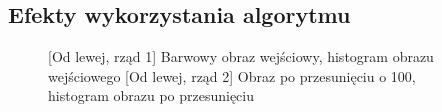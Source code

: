 \documentclass[a4paper,12pt, titlepage]{report}
\begin{document}
\subsection*{Efekty wykorzystania algorytmu}
\begin{figure}[h]
    \centering
    \qquad
    \caption{[Od lewej, rząd 1] Barwowy obraz wejściowy, histogram obrazu wejściowego [Od lewej, rząd 2] Obraz po przesunięciu o 100, histogram obrazu po przesunięciu}%
    \label{fig:geo_after_grey1}%
\end{figure}
\end{document}
